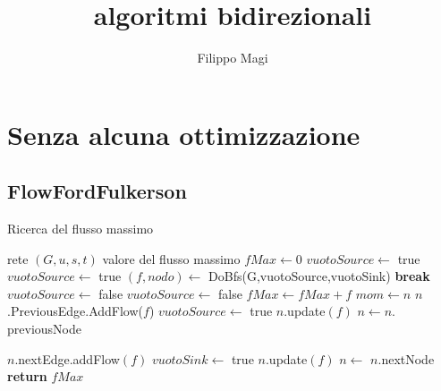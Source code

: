\documentclass{article}
\title{algoritmi bidirezionali}
\author{Filippo Magi }
\begin{document}
\maketitle
\section{Senza alcuna ottimizzazione}
\subsection{FlowFordFulkerson}
\begin{algorithm}
    \caption{Ricerca del flusso massimo}
    \begin{algorithmic}[1]
        \REQUIRE rete $(G,u,s,t)$
        \ENSURE valore del flusso massimo
        \STATE $fMax \leftarrow 0$
        \STATE$ vuotoSource \leftarrow$ true
        \STATE $vuotoSource \leftarrow$ true
        \STATE $(f, nodo) \leftarrow$ DoBfs(G,vuotoSource,vuotoSink)
        \STATE \textbf{break}
        \ENDIF
        \STATE $vuotoSource \leftarrow$ false
        \STATE $vuotoSource \leftarrow$ false
        \STATE $fMax \leftarrow fMax + f$
        \STATE $mom \leftarrow n$
        \STATE $n$.PreviousEdge.AddFlow($f$)
        \STATE $vuotoSource \leftarrow$ true
        \ENDIF
        \STATE $n.$update$(f)$ 
        \STATE $n \leftarrow n.$previousNode
        \ENDWHILE

        \STATE $n.$nextEdge.addFlow$(f)$
        \STATE $vuotoSink \leftarrow$ true
        \ENDIF
        \STATE $n.$update$(f)$ 
        \STATE $n \leftarrow$ $n.$nextNode
        \ENDWHILE
        \ENDWHILE
        \STATE \textbf{return} $fMax$
    \end{algorithmic}
\end{algorithm}
\end{document}
